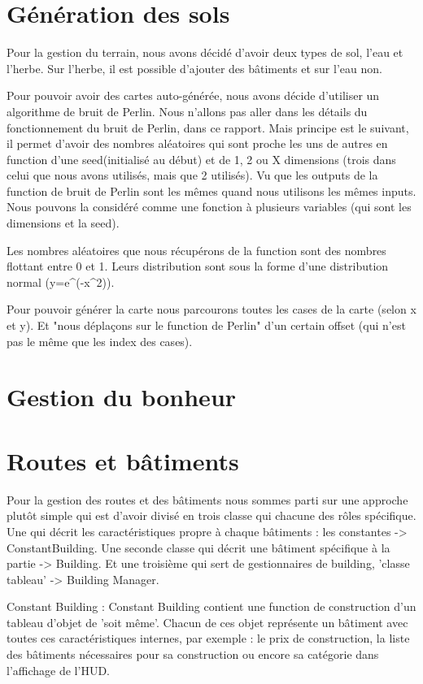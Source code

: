 \documentclass[a4paper,10pt,openany,oneside]{book}
\begin{document}
\section{Génération des sols}
Pour la gestion du terrain, nous avons décidé d'avoir deux types de sol, l'eau et l'herbe. Sur l'herbe, il est possible d'ajouter des bâtiments et sur l'eau non.

Pour pouvoir avoir des cartes auto-générée, nous avons décide d'utiliser un algorithme de bruit de Perlin. Nous n'allons pas aller dans les détails du fonctionnement du bruit de Perlin, dans ce rapport. Mais principe est le suivant, il permet d'avoir des nombres aléatoires qui sont proche les uns de autres en function d'une seed(initialisé au début) et de 1, 2 ou X dimensions (trois dans celui que nous avons utilisés, mais que 2 utilisés).  Vu que les outputs de la function de bruit de Perlin sont les mêmes quand nous utilisons les mêmes inputs. Nous pouvons la considéré comme une fonction à plusieurs variables (qui sont les dimensions et la seed). 

Les nombres aléatoires que nous récupérons de la function sont des nombres flottant entre 0 et 1.
Leurs distribution sont sous la forme d'une distribution normal (y=e^(-x^2)).

Pour pouvoir générer la carte nous parcourons toutes les cases de la carte (selon x et y). Et "nous déplaçons sur le function de Perlin" d'un certain offset (qui n'est pas le même que les index des cases). 
\section{Gestion du  bonheur}

\section{Routes et bâtiments}
Pour la gestion des routes et des bâtiments nous sommes parti sur une approche plutôt simple qui est d'avoir divisé en trois classe qui chacune des rôles spécifique. Une qui décrit les caractéristiques propre à chaque bâtiments : les constantes -> ConstantBuilding. Une seconde classe qui décrit une bâtiment spécifique à la partie -> Building. Et une troisième qui sert de gestionnaires de building, 'classe tableau' -> Building Manager. 

Constant Building :
Constant Building contient une function de construction d'un tableau d'objet de 'soit même'. Chacun de ces objet représente un bâtiment avec toutes ces caractéristiques internes, par exemple : le prix de construction, la liste des bâtiments nécessaires pour sa construction ou encore sa catégorie dans l'affichage de l'HUD.
\end{document}

